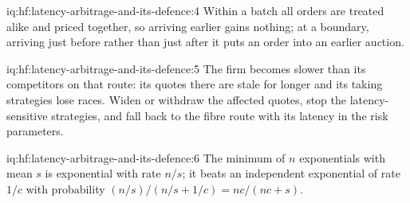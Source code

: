 \begin{solution}{iq:hf:latency-arbitrage-and-its-defence:4}
Within a batch all orders are treated alike and priced together, so arriving earlier gains nothing; at a boundary, arriving just before rather than
just after it puts an order into an earlier auction.
\end{solution}

\begin{solution}{iq:hf:latency-arbitrage-and-its-defence:5}
The firm becomes slower than its competitors on that route: its quotes there are stale for longer and its taking strategies lose races. Widen or
withdraw the affected quotes, stop the latency-sensitive strategies, and fall back to the fibre route with its latency in the risk parameters.
\end{solution}

\begin{solution}{iq:hf:latency-arbitrage-and-its-defence:6}
The minimum of $n$ exponentials with mean $s$ is exponential with rate $n/s$; it beats an independent exponential of rate $1/c$ with probability
$(n/s)/(n/s+1/c)=nc/(nc+s)$.
\end{solution}
